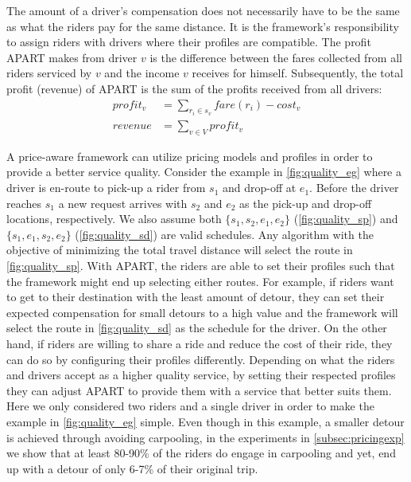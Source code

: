 The amount of a driver's compensation does not necessarily have to be the same as what the riders pay for the same distance. It is the framework's responsibility to assign riders with drivers where their profiles are compatible. The profit APART makes from driver $v$ is the difference between the fares collected from all riders serviced by $v$ and the income $v$ receives for himself. Subsequently, the total profit (revenue) of APART is the sum of the profits received from all drivers:
\vspace{-3mm}
\begin{align}
\label{eq:profit} 
profit_v &= \sum_{r_i \in s_v}fare(r_i) - cost_v\\
revenue &= \sum_{v \in V}profit_v
\end{align}
\vspace{-2mm}

A price-aware framework can utilize pricing models and profiles in order to provide a better service quality. Consider the example in \cref{fig:quality_eg} where a driver is en-route to pick-up a rider from $s_1$ and drop-off at $e_1$. Before the driver reaches $s_1$ a new request arrives with $s_2$ and $e_2$ as the pick-up and drop-off locations, respectively. We also assume both $\lbrace s_1, s_2, e_1, e_2 \rbrace$ (\cref{fig:quality_sp}) and $\lbrace s_1, e_1, s_2, e_2 \rbrace$ (\cref{fig:quality_sd}) are valid schedules. Any algorithm with the objective of minimizing the total travel distance will select the route in \cref{fig:quality_sp}. With APART, the riders are able to set their profiles such that the framework might end up selecting either routes. For example, if riders want to get to their destination with the least amount of detour, they can set their expected compensation for small detours to a high value and the framework will select the route in \cref{fig:quality_sd} as the schedule for the driver. On the other hand, if riders are willing to share a ride and reduce the cost of their ride, they can do so by configuring their profiles differently. Depending on what the riders and drivers accept as a higher quality service, by setting their respected profiles they can adjust APART to provide them with a service that better suits them. Here we only considered two riders and a single driver in order to make the example in \cref{fig:quality_eg} simple. Even though in this example, a smaller detour is achieved through avoiding carpooling, in the experiments in \cref{subsec:pricingexp} we show that at least 80-90\% of the riders do engage in carpooling and yet, end up with a detour of only 6-7\% of their original trip.

